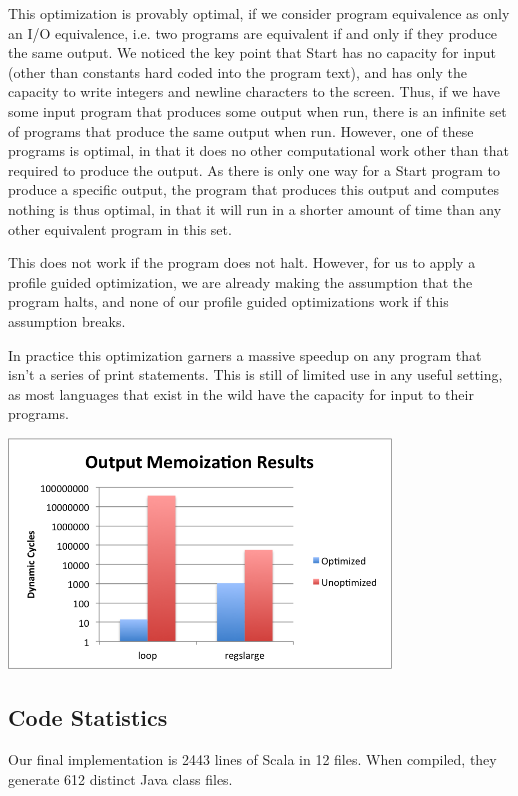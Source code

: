 \documentclass[12pt,letterpaper]{article}
\begin{document}
This optimization is provably optimal, if we consider program
equivalence as only an I/O equivalence, i.e. two programs are
equivalent if and only if they produce the same output. We noticed the
key point that Start has no capacity for input (other than constants
hard coded into the program text), and has only the capacity to write
integers and newline characters to the screen. Thus, if we have some
input program that produces some output when run, there is an infinite
set of programs that produce the same output when run. However, one of
these programs is optimal, in that it does no other computational work
other than that required to produce the output. As there is only one
way for a Start program to produce a specific output, the program that
produces this output and computes nothing is thus optimal, in that it
will run in a shorter amount of time than any other equivalent program
in this set.

This does not work if the program does not halt. However, for us to
apply a profile guided optimization, we are already making the
assumption that the program halts, and none of our profile guided
optimizations work if this assumption breaks.

In practice this optimization garners a massive speedup on any program
that isn't a series of print statements. This is still of limited use
in any useful setting, as most languages that exist in the wild have
the capacity for input to their programs.

\begin{center}
\includegraphics[width=4in]{memostats.png}
\end{center}

\subsection*{Code Statistics}

Our final implementation is 2443 lines of Scala in 12 files. When
compiled, they generate 612 distinct Java class files. 
\end{document}

